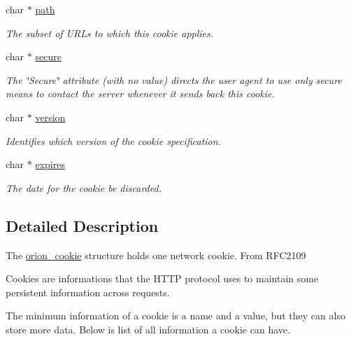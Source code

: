 \begin{DoxyCompactItemize}
char $\ast$ \hyperlink{structorion__cookie_a44196e6a5696d10442c29e639437196e}{path}
\begin{DoxyCompactList}\small\item\em The subset of URLs to which this cookie applies. \item\end{DoxyCompactList}\item 
char $\ast$ \hyperlink{structorion__cookie_aec238fb4192e50d4e96e474531c99f1b}{secure}
\begin{DoxyCompactList}\small\item\em The \char`\"{}Secure\char`\"{} attribute (with no value) directs the user agent to use only secure means to contact the server whenever it sends back this cookie. \item\end{DoxyCompactList}\item 
char $\ast$ \hyperlink{structorion__cookie_a56abfaab87c46691c1ef3ad0df23e864}{version}
\begin{DoxyCompactList}\small\item\em Identifies which version of the cookie specification. \item\end{DoxyCompactList}\item 
char $\ast$ \hyperlink{structorion__cookie_adb985222d6fc3d8bfb737c259d138366}{expires}
\begin{DoxyCompactList}\small\item\em The date for the cookie be discarded. \item\end{DoxyCompactList}\end{DoxyCompactItemize}


\subsection{Detailed Description}
The \hyperlink{structorion__cookie}{orion\_\-cookie} structure holds one network cookie. From RFC2109

Cookies are informations that the HTTP protocol uses to maintain some persistent information across requests.

The minimum information of a cookie is a name and a value, but they can also store more data. Below is list of all information a cookie can have.



